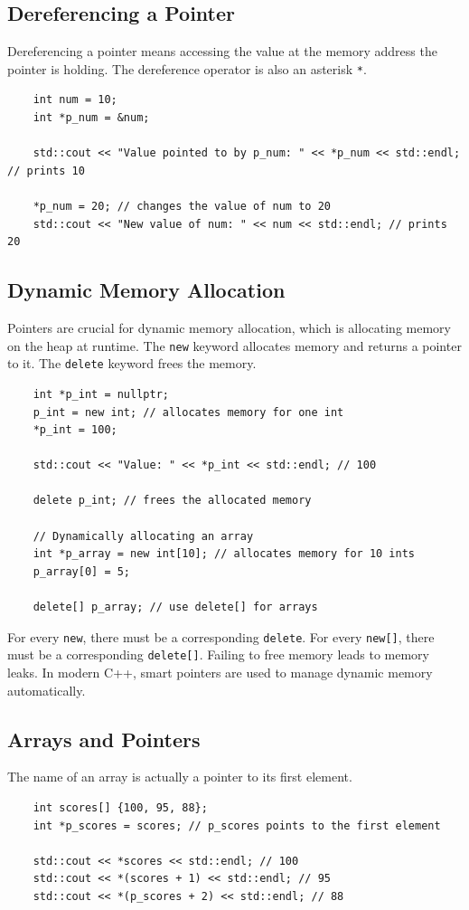 \subsection{Dereferencing a Pointer}
Dereferencing a pointer means accessing the value at the memory address the pointer is holding. The dereference operator is also an asterisk \texttt{*}.
\begin{lstlisting}
	int num = 10;
	int *p_num = &num;

	std::cout << "Value pointed to by p_num: " << *p_num << std::endl; // prints 10

	*p_num = 20; // changes the value of num to 20
	std::cout << "New value of num: " << num << std::endl; // prints 20
\end{lstlisting}

\subsection{Dynamic Memory Allocation}
Pointers are crucial for dynamic memory allocation, which is allocating memory on the heap at runtime. The \texttt{new} keyword allocates memory and returns a pointer to it. The \texttt{delete} keyword frees the memory.
\begin{lstlisting}
	int *p_int = nullptr;
	p_int = new int; // allocates memory for one int
	*p_int = 100;

	std::cout << "Value: " << *p_int << std::endl; // 100

	delete p_int; // frees the allocated memory

	// Dynamically allocating an array
	int *p_array = new int[10]; // allocates memory for 10 ints
	p_array[0] = 5;

	delete[] p_array; // use delete[] for arrays
\end{lstlisting}
\begin{remark}
For every \texttt{new}, there must be a corresponding \texttt{delete}. For every \texttt{new[]}, there must be a corresponding \texttt{delete[]}. Failing to free memory leads to memory leaks. In modern C++, smart pointers are used to manage dynamic memory automatically.
\end{remark}

\subsection{Arrays and Pointers}
The name of an array is actually a pointer to its first element.
\begin{lstlisting}
	int scores[] {100, 95, 88};
	int *p_scores = scores; // p_scores points to the first element

	std::cout << *scores << std::endl; // 100
	std::cout << *(scores + 1) << std::endl; // 95
	std::cout << *(p_scores + 2) << std::endl; // 88
\end{lstlisting}

